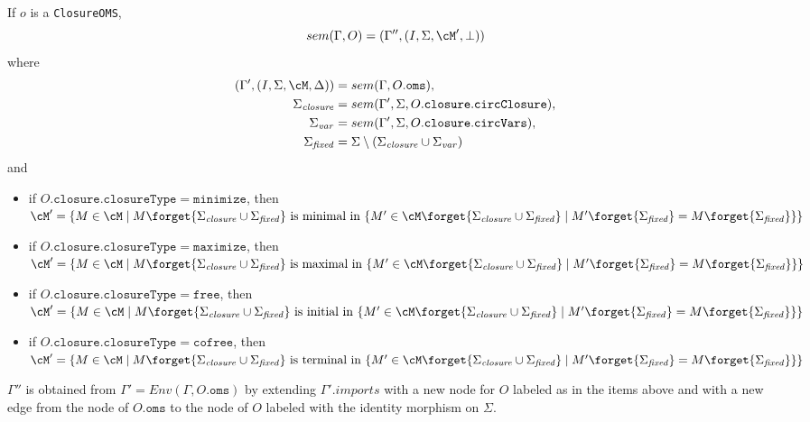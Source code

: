 \documentclass[10pt, a4paper]{isov2}
\newcommand*{\syntax}[1]{\texttt{#1}}
\begin{document}
If $o$ is a \syntax{ClosureOMS},
$$sem(\Gamma, O) = (\Gamma'',(I,\Sigma,\cM',\bot))$$
where
\begin{align*}
(\Gamma',(I,\Sigma,\cM,\Delta)) &= sem(\Gamma, O.\syntax{oms}),  \\
 \Sigma_{\mathit{closure}} &=sem(\Gamma', \Sigma,O.\syntax{closure}.\syntax{circClosure}), \\
\Sigma_{\mathit{var}} &= sem(\Gamma',\Sigma,O.\syntax{closure}.\syntax{circVars}), \\ 
 \Sigma_{\mathit{fixed}} &=\Sigma \setminus (\Sigma_{\mathit{closure}} \cup \Sigma_{\mathit{var}})
\end{align*}
and
\begin{itemize}
\item if $O.\syntax{closure}.\syntax{closureType} = \syntax{minimize}$, then\\
$\cM' = \{ M \in \cM \mid  M\forget{\Sigma_{\mathit{closure}}\cup\Sigma_{\mathit{fixed}}} \text{ is minimal in }    \{M' \in \cM\forget{\Sigma_{\mathit{closure}}\cup\Sigma_{\mathit{fixed}}} \mid M'\forget{\Sigma_{\mathit{fixed}}}=M\forget{\Sigma_{\mathit{fixed}}}\} \}
$
\item if $O.\syntax{closure}.\syntax{closureType} = \syntax{maximize}$, then\\
$\cM' = \{ M \in \cM \mid  M\forget{\Sigma_{\mathit{closure}}\cup\Sigma_{\mathit{fixed}}} \text{ is maximal in }    \{M' \in \cM\forget{\Sigma_{\mathit{closure}}\cup\Sigma_{\mathit{fixed}}} \mid M'\forget{\Sigma_{\mathit{fixed}}}=M\forget{\Sigma_{\mathit{fixed}}}\} \}
$
\item
if $O.\syntax{closure}.\syntax{closureType} = \syntax{free}$, then\\
$\cM' = \{ M \in \cM \mid  M\forget{\Sigma_{\mathit{closure}}\cup\Sigma_{\mathit{fixed}}} \text{ is initial in }    \{M' \in \cM\forget{\Sigma_{\mathit{closure}}\cup\Sigma_{\mathit{fixed}}} \mid M'\forget{\Sigma_{\mathit{fixed}}}=M\forget{\Sigma_{\mathit{fixed}}}\} \}
$
\item
if $O.\syntax{closure}.\syntax{closureType} = \syntax{cofree}$, then\\
$\cM' = \{ M \in \cM \mid  M\forget{\Sigma_{\mathit{closure}}\cup\Sigma_{\mathit{fixed}}} \text{ is terminal in }    \{M' \in \cM\forget{\Sigma_{\mathit{closure}}\cup\Sigma_{\mathit{fixed}}} \mid M'\forget{\Sigma_{\mathit{fixed}}}=M\forget{\Sigma_{\mathit{fixed}}}\} \}
$
\end{itemize}

$\Gamma''$ is obtained from
       $\Gamma' = Env(\Gamma, O.\syntax{oms})$
       by extending $\Gamma'.imports$
        with a new node for $O$ labeled as in the items above
        and with a new edge from the node of $O.\syntax{oms}$ to the node of $O$
        labeled with the identity morphism on $\Sigma$.
\end{document}
